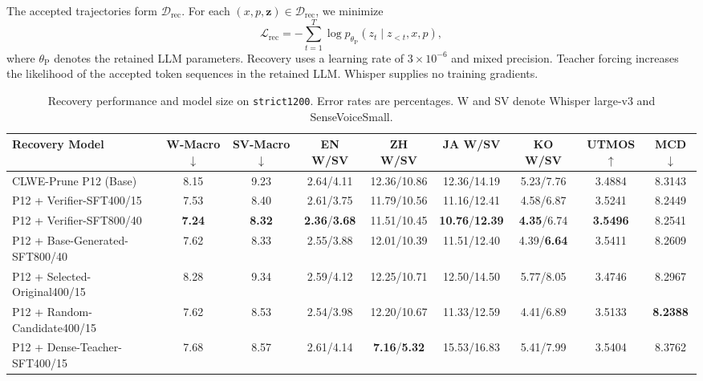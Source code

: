 \documentclass{article}
\newcounter{savedtablecounter}
\begin{document}
The accepted trajectories form $\mathcal{D}_{\mathrm{rec}}$. For each
$(x,p,\mathbf{z})\in\mathcal{D}_{\mathrm{rec}}$, we minimize
\begin{equation}
\mathcal{L}_{\mathrm{rec}}
= -\sum_{t=1}^{T}
\log p_{\theta_{\mathrm{P}}}(z_t\mid z_{<t},x,p),
\label{eq:recovery_loss}
\end{equation}
where $\theta_{\mathrm{P}}$ denotes the retained LLM parameters.
Recovery uses a learning rate of $3\times10^{-6}$ and mixed precision.
Teacher forcing increases the likelihood of the accepted token
sequences in the retained LLM. Whisper supplies no training gradients.
\setcounter{savedtablecounter}{\value{table}}
\setcounter{table}{2}
\begin{table}[!t]
\centering
\caption{Recovery performance and model size on \texttt{strict1200}.
Error rates are percentages. W and SV denote Whisper large-v3 and
SenseVoiceSmall.}
\label{tab:recovery_results}
\small
\setlength{\tabcolsep}{3pt}
\renewcommand{\arraystretch}{1.05}
\begin{tabular}{lcccccccc}
\toprule
\textbf{Recovery Model} & \textbf{W-Macro$\downarrow$} &
\textbf{SV-Macro$\downarrow$} &
\textbf{EN W/SV} & \textbf{ZH W/SV} & \textbf{JA W/SV} &
\textbf{KO W/SV} & \textbf{UTMOS$\uparrow$} & \textbf{MCD$\downarrow$} \\
\midrule
CLWE-Prune P12 (Base) & 8.15 & 9.23 &
2.64/4.11 & 12.36/10.86 & 12.36/14.19 & 5.23/7.76 & 3.4884 & 8.3143 \\
P12 + Verifier-SFT400/15 & 7.53 & 8.40 &
2.61/3.75 & 11.79/10.56 & 11.16/12.41 & 4.58/6.87 & 3.5241 & 8.2449 \\
P12 + Verifier-SFT800/40 & \textbf{7.24} & \textbf{8.32} &
\textbf{2.36}/\textbf{3.68} & 11.51/10.45 & \textbf{10.76}/\textbf{12.39} & \textbf{4.35}/6.74 & \textbf{3.5496} & 8.2541 \\
P12 + Base-Generated-SFT800/40 & 7.62 & 8.33 &
2.55/3.88 & 12.01/10.39 & 11.51/12.40 & 4.39/\textbf{6.64} & 3.5411 & 8.2609 \\
P12 + Selected-Original400/15 & 8.28 & 9.34 &
2.59/4.12 & 12.25/10.71 & 12.50/14.50 & 5.77/8.05 & 3.4746 & 8.2967 \\
P12 + Random-Candidate400/15 & 7.62 & 8.53 &
2.54/3.98 & 12.20/10.67 & 11.33/12.59 & 4.41/6.89 & 3.5133 & \textbf{8.2388} \\
P12 + Dense-Teacher-SFT400/15 & 7.68 & 8.57 &
2.61/4.14 & \textbf{7.16}/\textbf{5.32} & 15.53/16.83 & 5.41/7.99 & 3.5404 & 8.3762 \\

\end{tabular}
\end{table}
\end{document}
